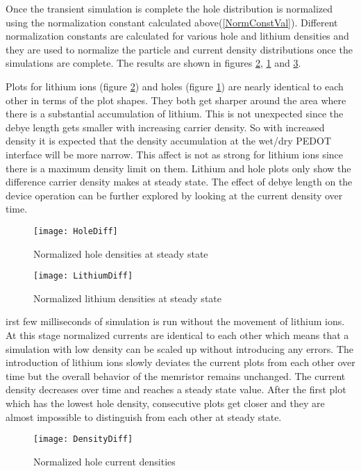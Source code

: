 \begin{doublespace}
Once the transient simulation is complete the hole distribution is normalized using the normalization constant calculated above(\ref{NormConstVal}). Different normalization constants are calculated for various hole and lithium densities and they are used to normalize the particle and current density distributions once the simulations are complete. The results are shown in figures \ref{LithiumDiff}, \ref{HoleDiff} and \ref{DensityDiff}. 
 
Plots for lithium ions (figure \ref{LithiumDiff}) and holes (figure \ref{HoleDiff}) are nearly identical to each other in terms of the plot shapes. They both get sharper around the area where there is a substantial accumulation of lithium. This is not unexpected since the debye length gets smaller with increasing carrier density. So with increased density it is expected that the density accumulation at the wet/dry PEDOT interface will be more narrow. This affect is not as strong for lithium ions since there is a maximum density limit on them. Lithium and hole plots only show the difference carrier density makes at steady state. The effect of debye length on the device operation can be further explored by looking at the current density over time.   

\begin{figure}[!htp]
\centering
\texttt{[image: HoleDiff]}
\caption{Normalized hole densities at steady state} 
\label{HoleDiff}
\end{figure}

\begin{figure}[!htp]
\centering
\texttt{[image: LithiumDiff]}
\caption{Normalized lithium densities at steady state} 
\label{LithiumDiff}
\end{figure}

irst few milliseconds of  simulation is run without  the movement of lithium ions. At this stage normalized currents are identical to each other which means that a simulation with low density can be scaled up without introducing any errors. The introduction of lithium ions slowly deviates the current plots from each other over time but the overall behavior of the memristor remains unchanged. The current density decreases over time and reaches a steady state value. After the first plot which has the lowest hole density, consecutive plots get closer and they are almost impossible to distinguish from each other at steady state.

\begin{figure}[!htp]
\centering
\texttt{[image: DensityDiff]}
\caption{Normalized hole current densities} 
\label{DensityDiff}
\end{figure}


\end{doublespace}
